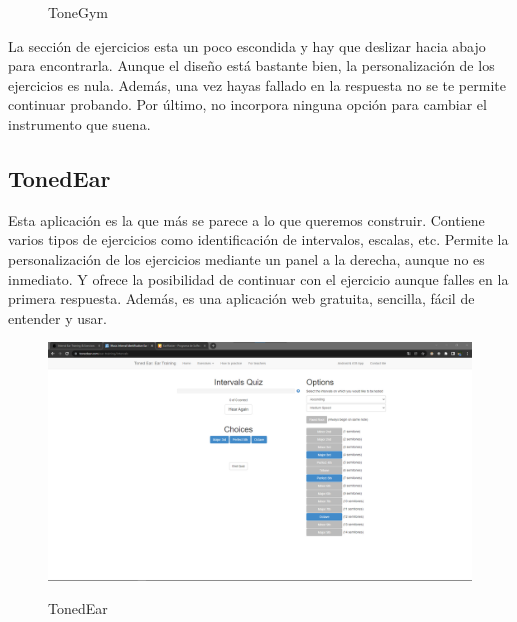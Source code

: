 \documentclass[12pt,twoside,titlepage]{report}
\begin{document}
\begin{figure}[H]
    \centering
    \caption{ToneGym}
    \label{f:ToneGym2}
   \end{figure}

La sección de ejercicios esta un poco escondida y hay que deslizar hacia abajo para encontrarla. Aunque el diseño está bastante bien, la personalización de los ejercicios es nula. Además, una vez hayas fallado en la respuesta no se te permite continuar probando. Por último, no incorpora ninguna opción para cambiar el instrumento que suena.

\subsection{TonedEar}

Esta aplicación es la que más se parece a lo que queremos construir. Contiene varios tipos de ejercicios como identificación de intervalos, escalas, etc. Permite la personalización de los ejercicios mediante un panel a la derecha, aunque no es inmediato. Y ofrece la posibilidad de continuar con el ejercicio aunque falles en la primera respuesta. Además, es una aplicación web gratuita, sencilla, fácil de entender y usar.

\begin{figure}[H] 
    \includegraphics[scale=0.25]{Estado del Arte/tonedear}
    \centering
    \label{fig:tonedear}
    \caption{TonedEar}
\end{figure}
\end{document}
